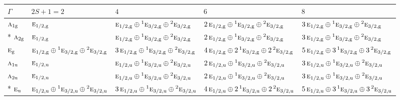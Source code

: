 \documentclass[10pt,a4paper]{article}
\numberwithin{equation}{section}
\newcommand{\irr}[1]{\text{\normalfont\scshape #1}}
\newcommand{\conjpair}[1]{{}^{#1}}
\newcommand{\ptag}[1]{\mathrm{#1}}
\begin{document}
{\small\setlength{\tabcolsep}{3pt}\begin{longtable}{@{}l>{\RaggedRight\arraybackslash}p{}>{\RaggedRight\arraybackslash}p{}>{\RaggedRight\arraybackslash}p{}>{\RaggedRight\arraybackslash}p{}@{}}\toprule
$\Gamma$ & $2S + 1 = 2$ & $4$ & $6$ & $8$\\\midrule\endhead
\bottomrule\endfoot\endlastfoot
$\irr{a}_{1\ptag{g}}$ & $\irr{e}_{1/2,\ptag{g}}$ & $\irr{e}_{1/2,\ptag{g}}\oplus \conjpair{1}\irr{e}_{3/2,\ptag{g}}\oplus \conjpair{2}\irr{e}_{3/2,\ptag{g}}$ & $2\,\irr{e}_{1/2,\ptag{g}}\oplus \conjpair{1}\irr{e}_{3/2,\ptag{g}}\oplus \conjpair{2}\irr{e}_{3/2,\ptag{g}}$ & $3\,\irr{e}_{1/2,\ptag{g}}\oplus \conjpair{1}\irr{e}_{3/2,\ptag{g}}\oplus \conjpair{2}\irr{e}_{3/2,\ptag{g}}$\\*
$\irr{a}_{2\ptag{g}}$ & $\irr{e}_{1/2,\ptag{g}}$ & $\irr{e}_{1/2,\ptag{g}}\oplus \conjpair{1}\irr{e}_{3/2,\ptag{g}}\oplus \conjpair{2}\irr{e}_{3/2,\ptag{g}}$ & $2\,\irr{e}_{1/2,\ptag{g}}\oplus \conjpair{1}\irr{e}_{3/2,\ptag{g}}\oplus \conjpair{2}\irr{e}_{3/2,\ptag{g}}$ & $3\,\irr{e}_{1/2,\ptag{g}}\oplus \conjpair{1}\irr{e}_{3/2,\ptag{g}}\oplus \conjpair{2}\irr{e}_{3/2,\ptag{g}}$\\
$\irr{e}_{\ptag{g}}$ & $\irr{e}_{1/2,\ptag{g}}\oplus \conjpair{1}\irr{e}_{3/2,\ptag{g}}\oplus \conjpair{2}\irr{e}_{3/2,\ptag{g}}$ & $3\,\irr{e}_{1/2,\ptag{g}}\oplus \conjpair{1}\irr{e}_{3/2,\ptag{g}}\oplus \conjpair{2}\irr{e}_{3/2,\ptag{g}}$ & $4\,\irr{e}_{1/2,\ptag{g}}\oplus 2\,\conjpair{1}\irr{e}_{3/2,\ptag{g}}\oplus 2\,\conjpair{2}\irr{e}_{3/2,\ptag{g}}$ & $5\,\irr{e}_{1/2,\ptag{g}}\oplus 3\,\conjpair{1}\irr{e}_{3/2,\ptag{g}}\oplus 3\,\conjpair{2}\irr{e}_{3/2,\ptag{g}}$\\
$\irr{a}_{1\ptag{u}}$ & $\irr{e}_{1/2,\ptag{u}}$ & $\irr{e}_{1/2,\ptag{u}}\oplus \conjpair{1}\irr{e}_{3/2,\ptag{u}}\oplus \conjpair{2}\irr{e}_{3/2,\ptag{u}}$ & $2\,\irr{e}_{1/2,\ptag{u}}\oplus \conjpair{1}\irr{e}_{3/2,\ptag{u}}\oplus \conjpair{2}\irr{e}_{3/2,\ptag{u}}$ & $3\,\irr{e}_{1/2,\ptag{u}}\oplus \conjpair{1}\irr{e}_{3/2,\ptag{u}}\oplus \conjpair{2}\irr{e}_{3/2,\ptag{u}}$\\
$\irr{a}_{2\ptag{u}}$ & $\irr{e}_{1/2,\ptag{u}}$ & $\irr{e}_{1/2,\ptag{u}}\oplus \conjpair{1}\irr{e}_{3/2,\ptag{u}}\oplus \conjpair{2}\irr{e}_{3/2,\ptag{u}}$ & $2\,\irr{e}_{1/2,\ptag{u}}\oplus \conjpair{1}\irr{e}_{3/2,\ptag{u}}\oplus \conjpair{2}\irr{e}_{3/2,\ptag{u}}$ & $3\,\irr{e}_{1/2,\ptag{u}}\oplus \conjpair{1}\irr{e}_{3/2,\ptag{u}}\oplus \conjpair{2}\irr{e}_{3/2,\ptag{u}}$\\*
$\irr{e}_{\ptag{u}}$ & $\irr{e}_{1/2,\ptag{u}}\oplus \conjpair{1}\irr{e}_{3/2,\ptag{u}}\oplus \conjpair{2}\irr{e}_{3/2,\ptag{u}}$ & $3\,\irr{e}_{1/2,\ptag{u}}\oplus \conjpair{1}\irr{e}_{3/2,\ptag{u}}\oplus \conjpair{2}\irr{e}_{3/2,\ptag{u}}$ & $4\,\irr{e}_{1/2,\ptag{u}}\oplus 2\,\conjpair{1}\irr{e}_{3/2,\ptag{u}}\oplus 2\,\conjpair{2}\irr{e}_{3/2,\ptag{u}}$ & $5\,\irr{e}_{1/2,\ptag{u}}\oplus 3\,\conjpair{1}\irr{e}_{3/2,\ptag{u}}\oplus 3\,\conjpair{2}\irr{e}_{3/2,\ptag{u}}$\\
\bottomrule\end{longtable}}
\end{document}
